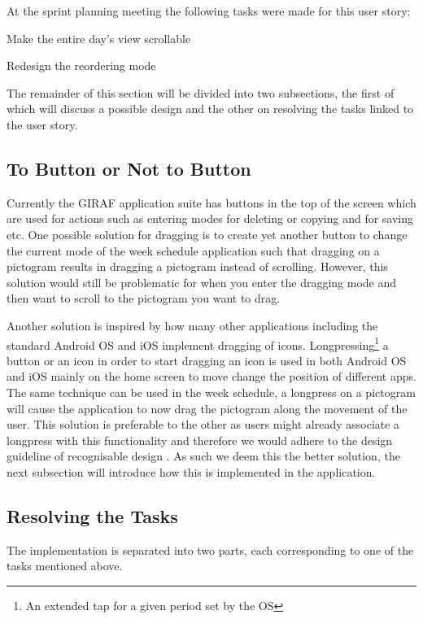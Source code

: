 \bigskip \noindent
At the sprint planning meeting the following tasks were made for this user story:
\begin{eletterate}
    \item Make the entire day's view scrollable
    \item Redesign the reordering mode
\end{eletterate}
The remainder of this section will be divided into two subsections, the first of which will discuss a possible design and the other on resolving the tasks linked to the user story.

\subsection*{To Button or Not to Button} %
Currently the GIRAF application suite has buttons in the top of the screen which are used for actions such as entering modes for deleting or copying and for saving etc.
One possible solution for dragging is to create yet another button to change the current mode of the week schedule application such that dragging on a pictogram results in dragging a pictogram instead of scrolling.
However, this solution would still be problematic for when you enter the dragging mode and then want to scroll to the pictogram you want to drag.

Another solution is inspired by how many other applications including the standard Android OS and iOS implement dragging of icons.
Longpressing\footnote{An extended tap for a given period set by the OS} a button or an icon in order to start dragging an icon is used in both Android OS and iOS mainly on the home screen to move change the position of different apps.
The same technique can be used in the week schedule, a longpress on a pictogram will cause the application to now drag the pictogram along the movement of the user.
This solution is preferable to the other as users might already associate a longpress with this functionality and therefore we would adhere to the design guideline of recognisable design \cite[p.~51]{DESIGNBOOK}.
As such we deem this the better solution, the next subsection will introduce how this is implemented in the application.

\subsection*{Resolving the Tasks}
The implementation is separated into two parts, each corresponding to one of the tasks mentioned above.
